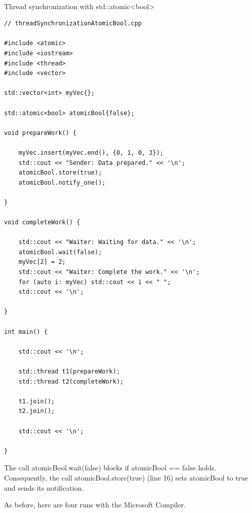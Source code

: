\hspace*{\fill} \\ %
\noindent
Thread synchronization with std::atomic<bool>
\begin{lstlisting}[style=styleCXX]
// threadSynchronizationAtomicBool.cpp

#include <atomic>
#include <iostream>
#include <thread>
#include <vector>

std::vector<int> myVec{};

std::atomic<bool> atomicBool{false};

void prepareWork() {

	myVec.insert(myVec.end(), {0, 1, 0, 3});
	std::cout << "Sender: Data prepared." << '\n';
	atomicBool.store(true);
	atomicBool.notify_one();

}

void completeWork() {

	std::cout << "Waiter: Waiting for data." << '\n';
	atomicBool.wait(false);
	myVec[2] = 2;
	std::cout << "Waiter: Complete the work." << '\n';
	for (auto i: myVec) std::cout << i << " ";
	std::cout << '\n';

}

int main() {

	std::cout << '\n';
	
	std::thread t1(prepareWork);
	std::thread t2(completeWork);
	
	t1.join();
	t2.join();
	
	std::cout << '\n';

}
\end{lstlisting}

The call atomicBool.wait(false) blocks if atomicBool == false holds. Consequently, the call atomicBool.store(true) (line 16) sets atomicBool to true and sends its notification.

As before, here are four runs with the Microsoft Compiler.

